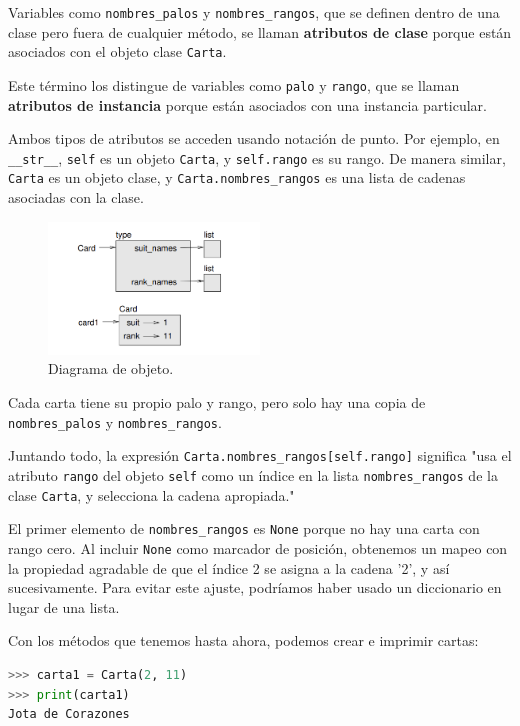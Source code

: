 Variables como \texttt{nombres\_palos} y \texttt{nombres\_rangos}, que se definen dentro de una clase pero fuera de cualquier método, se llaman \textbf{atributos de clase} porque están asociados con el objeto clase \texttt{Carta}.

Este término los distingue de variables como \texttt{palo} y \texttt{rango}, que se llaman \textbf{atributos de instancia} porque están asociados con una instancia particular.

Ambos tipos de atributos se acceden usando notación de punto. Por ejemplo, en \texttt{\_\_str\_\_}, \texttt{self} es un objeto \texttt{Carta}, y \texttt{self.rango} es su rango. De manera similar, \texttt{Carta} es un objeto clase, y \texttt{Carta.nombres\_rangos} es una lista de cadenas asociadas con la clase.

\begin{figure}[h]
\centering
\includegraphics[width=0.5\textwidth]{./images/chapter_18_1.png}
\caption{Diagrama de objeto.}
\label{fig:class_diagrama}
\end{figure}

Cada carta tiene su propio palo y rango, pero solo hay una copia de \texttt{nombres\_palos} y \texttt{nombres\_rangos}.

Juntando todo, la expresión \texttt{Carta.nombres\_rangos[self.rango]} significa "usa el atributo \texttt{rango} del objeto \texttt{self} como un índice en la lista \texttt{nombres\_rangos} de la clase \texttt{Carta}, y selecciona la cadena apropiada."

El primer elemento de \texttt{nombres\_rangos} es \texttt{None} porque no hay una carta con rango cero. Al incluir \texttt{None} como marcador de posición, obtenemos un mapeo con la propiedad agradable de que el índice 2 se asigna a la cadena '2', y así sucesivamente. Para evitar este ajuste, podríamos haber usado un diccionario en lugar de una lista.

Con los métodos que tenemos hasta ahora, podemos crear e imprimir cartas:

\begin{lstlisting}[language=Python]
>>> carta1 = Carta(2, 11)
>>> print(carta1)
Jota de Corazones
\end{lstlisting}

